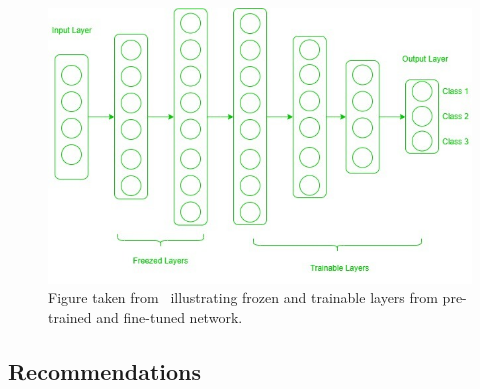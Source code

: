 \documentclass[11pt]{article}
\begin{document}
\begin{figure}[H]
    \centering
    \includegraphics[width=0.7\linewidth]{images/Frozen-layers.jpg}
    \caption{Figure taken from~\cite{geeks-transfer-learning} illustrating frozen and trainable layers from pre-trained and fine-tuned network.}
   \label{fig:frozen-layers}
\end{figure}

\subsection{Recommendations}
\end{document}
